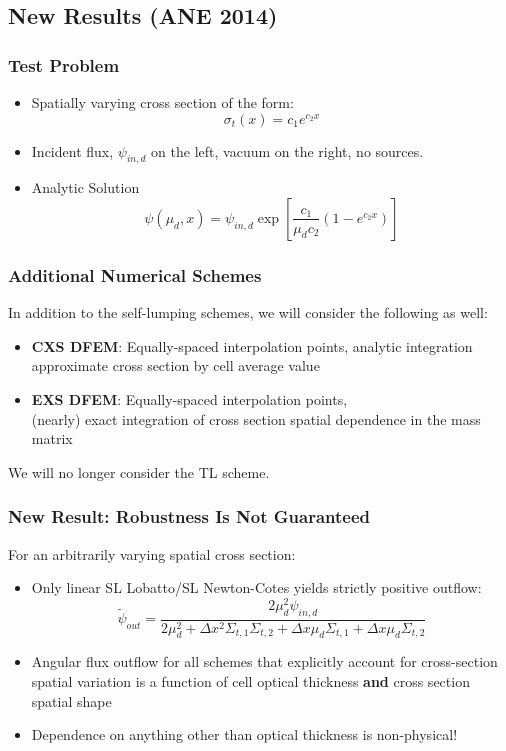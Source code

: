 \documentclass{beamer}
\newcommand{\be}{\begin{equation*}}   %
\newcommand{\ee}{\end{equation*}}
\begin{document}
\subsection{New Results (ANE 2014) }
\begin{frame}
\frametitle{Test Problem}
\begin{itemize}
\item Spatially varying cross section of the form:
\be
\sigma_t(x) = c_1 e^{c_2 x}
\ee
\item Incident flux, $\psi_{in,d}$ on the left, vacuum on the right, no sources.
\item Analytic Solution
\be
\psi(\mu_d,x) = \psi_{in,d}\exp\left[ \frac{c_1 }{\mu_d c_2 } \left(1- e^{c_2 x}  \right) \right] 
\ee
\end{itemize}
\end{frame}

\begin{frame}
\frametitle{Additional Numerical Schemes}
In addition to the self-lumping schemes, we will consider the following as well:
\begin{itemize}
\item {\bf CXS DFEM}: Equally-spaced interpolation points, analytic integration approximate cross section by cell average value
\item {\bf EXS DFEM}: Equally-spaced interpolation points, \\ (nearly) exact integration of cross section spatial dependence in the mass matrix
\end{itemize}
We will no longer consider the TL scheme.
\end{frame}

\begin{frame}
\frametitle{New Result: Robustness Is Not Guaranteed}
For an arbitrarily varying spatial cross section:
\begin{itemize}
\item Only linear SL Lobatto/SL Newton-Cotes yields strictly positive outflow:
\be
\widetilde{\psi}_{out} = \frac{2\mu_d^2 \psi_{in,d}}{2\mu_d^2 + \Delta x^2 \Sigma_{t,1} \Sigma_{t,2} + \Delta x \mu_d \Sigma_{t,1} + \Delta x \mu_d \Sigma_{t,2}}
\ee
\item Angular flux outflow for all schemes that explicitly account for cross-section spatial variation is a function of cell optical thickness {\bf and} cross section spatial shape
\item Dependence on anything other than optical thickness is non-physical!
\end{itemize}
\end{frame}
\end{document}
